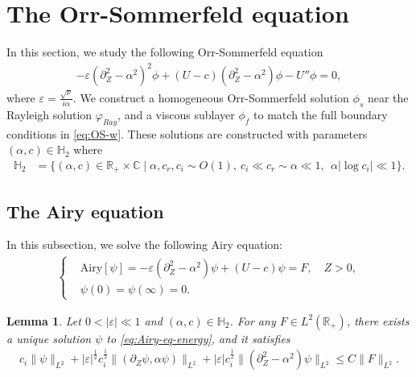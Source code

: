 \documentclass[reqno,11pt]{amsart}
\numberwithin{equation}{section}
\numberwithin{equation}{section}
\theoremstyle{plain}
\newtheorem{lemma}[theorem]{Lemma}
\begin{document}






\section{The Orr-Sommerfeld equation}\label{sec-OS}
In this section, we study the following Orr-Sommerfeld equation 
\begin{align}\label{eq:OSeq}
		-\varepsilon (\partial_Z^2-\alpha^2)^2\phi +(U-c)(\partial_Z^2-\alpha^2)\phi-U''\phi=0,
\end{align}
where $\varepsilon=\frac{\sqrt{\nu}}{i\alpha}.$ We construct a homogeneous Orr-Sommerfeld solution $\phi_s$ near the Rayleigh solution $\varphi_{Ray}$, and a viscous sublayer $\phi_f$ to match the full boundary conditions in \eqref{eq:OS-w}. These solutions are constructed with parameters $(\alpha,c)\in \mathbb{H}_2$ where
\begin{align*}
	\mathbb{H}_2&=\{(\alpha,c)\in \mathbb{R}_{+}\times\mathbb{C}\mid \alpha, c_r, c_i\sim O(1),~ c_i\ll c_r\sim \alpha\ll1,~~ \alpha|\log c_i| \ll 1\}.
\end{align*} 

\subsection{The Airy equation}\label{subsection-energy}

In this subsection, we solve the following Airy equation: %
\begin{align}\label{eq:Airy-eq-energy}
	\left\{\begin{aligned}
		&\mathrm{Airy}[\psi]=-\varepsilon(\partial_Z^2-\alpha^2)\psi+(U-c)\psi =F,\quad Z>0,\\ &\psi(0)=\psi(\infty)=0.
	\end{aligned}
	\right.	
\end{align}
\begin{lemma}\label{prop-airy-energy}
	Let $0<|\varepsilon|\ll 1$ and $(\alpha,c)\in \mathbb{H}_2$. For any $F\in L^2(\mathbb{R}_+)$, there exists a unique solution $\psi$ to \eqref{eq:Airy-eq-energy}, and it satisfies
	\begin{align}\label{est-L2-psi-energy}
			c_i\|\psi\|_{L^2}+|\varepsilon|^{\frac12} c_i^{\frac{1}{2}}\|(\partial_Z\psi,\alpha\psi)\|_{L^2}+|\varepsilon|c_i^{\frac12}\|(\partial_Z^2-\alpha^2)\psi\|_{L^2}\leq C\|F\|_{L^2}.
		\end{align}
\end{lemma}
\end{document}
